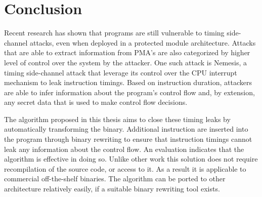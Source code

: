 \section{Conclusion}
Recent research has shown that programs are still vulnerable to timing side-channel attacks, even when deployed in a protected module architecture. 
Attacks that are able to extract information from PMA's are also categorized by higher level of control over the system by the attacker. 
One such attack is Nemesis, a timing side-channel attack that leverage its control over the CPU interrupt mechanism to leak instruction timings. 
Based on instruction duration, attackers are able to infer information about the program's control flow and, by extension, any secret data that is used to make control flow decisions. 

The algorithm proposed in this thesis aims to close these timing leaks by automatically transforming the binary. 
Additional instruction are inserted into the program through binary rewriting to ensure that instruction 
timings cannot leak any information about the control flow. An evaluation indicates that the algorithm is effective in doing so.
Unlike other work this solution does not require recompilation of the 
source code, or access to it. 
As a result it is applicable to commercial off-the-shelf binaries.  
The algorithm can be ported to other architecture relatively easily, if a suitable binary rewriting tool exists.
